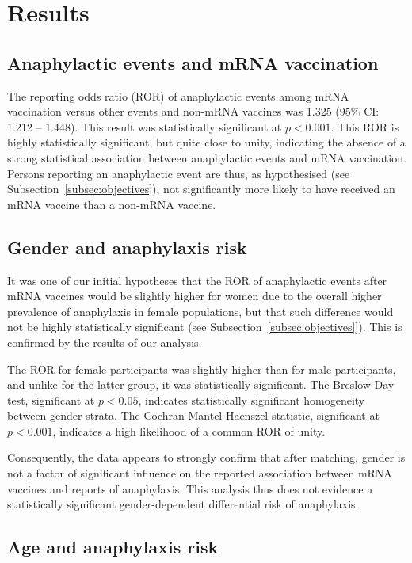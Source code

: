 \documentclass{article}
\begin{document}
\section{Results}

\subsection{Anaphylactic events and mRNA vaccination}

The reporting odds ratio (ROR) of anaphylactic events among mRNA vaccination versus other events and non-mRNA vaccines was 1.325 (95\% CI: 1.212 -- 1.448).
This result was statistically significant at $p < 0.001$.
This ROR is highly statistically significant, but quite close to unity, indicating the absence of a strong statistical association between anaphylactic events and mRNA vaccination.
Persons reporting an anaphylactic event are thus, as hypothesised (see Subsection~\ref{subsec:objectives}), not significantly more likely to have received an mRNA vaccine than a non-mRNA vaccine.

\subsection{Gender and anaphylaxis risk}

It was one of our initial hypotheses that the ROR of anaphylactic events after mRNA vaccines would be slightly higher for women due to the overall higher prevalence of anaphylaxis in female populations, but that such difference would not be highly statistically significant (see Subsection~\ref{subsec:objectives}]).
This is confirmed by the results of our analysis.

The ROR for female participants was slightly higher than for male participants, and unlike for the latter group, it was statistically significant.
The Breslow-Day test, significant at $p < 0.05$, indicates statistically significant homogeneity between gender strata.
The Cochran-Mantel-Haenszel statistic, significant at $p < 0.001$, indicates a high likelihood of a common ROR of unity.

Consequently, the data appears to strongly confirm that after matching, gender is not a factor of significant influence on the reported association between mRNA vaccines and reports of anaphylaxis.
This analysis thus does not evidence a statistically significant gender-dependent differential risk of anaphylaxis.

\subsection{Age and anaphylaxis risk}
\end{document}
